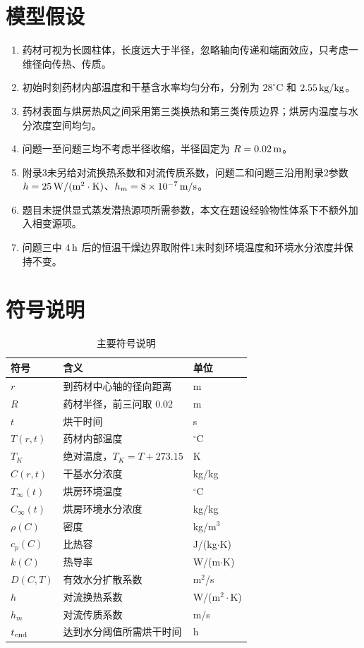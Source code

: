 \documentclass[UTF8,a4paper,12pt]{ctexart}
\numberwithin{equation}{section}
\begin{document}
\section{模型假设}
\begin{enumerate}[label=\arabic*.,leftmargin=2.5em]
  \item 药材可视为长圆柱体，长度远大于半径，忽略轴向传递和端面效应，只考虑一维径向传热、传质。
  \item 初始时刻药材内部温度和干基含水率均匀分布，分别为 $28^\circ\mathrm C$ 和 $2.55\rm\,kg/kg$。
  \item 药材表面与烘房热风之间采用第三类换热和第三类传质边界；烘房内温度与水分浓度空间均匀。
  \item 问题一至问题三均不考虑半径收缩，半径固定为 $R=0.02\rm\,m$。
  \item 附录3未另给对流换热系数和对流传质系数，问题二和问题三沿用附录2参数 $h=25\rm\,W/(m^2\cdot K)$、$h_m=8\times10^{-7}\rm\,m/s$。
  \item 题目未提供显式蒸发潜热源项所需参数，本文在题设经验物性体系下不额外加入相变源项。
  \item 问题三中 $4\rm\,h$ 后的恒温干燥边界取附件1末时刻环境温度和环境水分浓度并保持不变。
\end{enumerate}

\section{符号说明}
\begin{table}[H]
  \centering
  \caption{主要符号说明}
  \begin{tabular}{>{\centering\arraybackslash}p{}p{}>{\centering\arraybackslash}p{}}
    \toprule
    符号 & 含义 & 单位\\ \midrule
    $r$ & 到药材中心轴的径向距离 & m\\
    $R$ & 药材半径，前三问取 $0.02$ & m\\
    $t$ & 烘干时间 & s\\
    $T(r,t)$ & 药材内部温度 & $^\circ\mathrm C$\\
    $T_K$ & 绝对温度，$T_K=T+273.15$ & K\\
    $C(r,t)$ & 干基水分浓度 & kg/kg\\
    $T_\infty(t)$ & 烘房环境温度 & $^\circ\mathrm C$\\
    $C_\infty(t)$ & 烘房环境水分浓度 & kg/kg\\
    $\rho(C)$ & 密度 & kg/m$^3$\\
    $c_p(C)$ & 比热容 & J/(kg$\cdot$K)\\
    $k(C)$ & 热导率 & W/(m$\cdot$K)\\
    $D(C,T)$ & 有效水分扩散系数 & m$^2$/s\\
    $h$ & 对流换热系数 & W/(m$^2\cdot$K)\\
    $h_m$ & 对流传质系数 & m/s\\
    $t_{\rm end}$ & 达到水分阈值所需烘干时间 & h\\
    \bottomrule
  \end{tabular}
\end{table}
\end{document}
